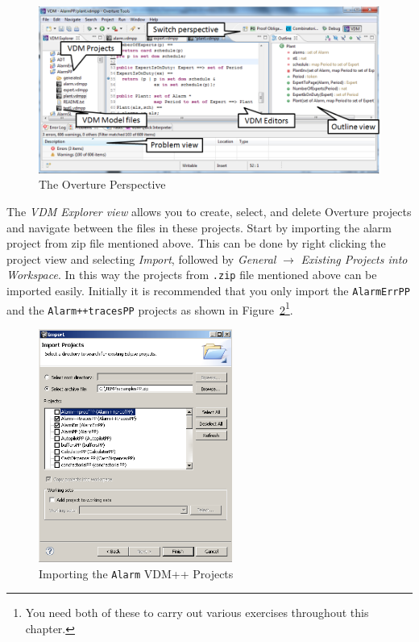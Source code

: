 \begin{figure}[!htb]
\begin{center}
  \includegraphics[width=5in]{figures/OverturePerspective}
  \caption[labelInTOC]{The Overture Perspective}
  \label{fig:OverturePerspective}
\end{center}
\end{figure}

The \emph{VDM Explorer view} allows you to create, select, and
delete Overture projects and navigate between the files in these
projects. Start by importing the alarm project from zip file mentioned
above. This can be done by right clicking the project view
and selecting \emph{Import}, followed by \emph{General} $\rightarrow$
\emph{Existing Projects into Workspace}.  In this way the projects
from \texttt{.zip} file mentioned above can be imported easily. Initially it is
recommended that you only import the \texttt{AlarmErrPP} and the
\texttt{Alarm++tracesPP} projects as shown in
Figure~\ref{fig:importalarm}\footnote{You need both of these to
  carry out various exercises throughout this chapter.}.

\begin{figure}[!htb]
\begin{center}
  \includegraphics[width=2.5in]{figures/importalarmprofs}
  \caption[labelInTOC]{Importing the \texttt{Alarm} VDM++ Projects}
  \label{fig:importalarm}
\end{center}
\end{figure}

